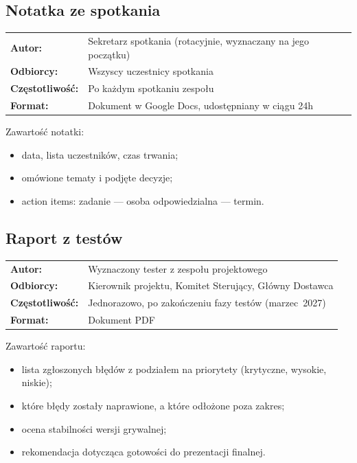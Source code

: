\documentclass[11pt,a4paper]{article}
\begin{document}
\subsection{Notatka ze spotkania}

\begin{tabular}{ll}
\textbf{Autor:}         & Sekretarz spotkania (rotacyjnie, wyznaczany na jego początku) \\
\textbf{Odbiorcy:}      & Wszyscy uczestnicy spotkania \\
\textbf{Częstotliwość:} & Po każdym spotkaniu zespołu \\
\textbf{Format:}        & Dokument w Google Docs, udostępniany w ciągu 24h \\
\end{tabular}

\vspace{0.5em}
Zawartość notatki:
\begin{itemize}[noitemsep]
    \item data, lista uczestników, czas trwania;
    \item omówione tematy i podjęte decyzje;
    \item action items: zadanie --- osoba odpowiedzialna --- termin.
\end{itemize}

\subsection{Raport z testów}

\begin{tabular}{ll}
\textbf{Autor:}         & Wyznaczony tester z zespołu projektowego \\
\textbf{Odbiorcy:}      & Kierownik projektu, Komitet Sterujący, Główny Dostawca \\
\textbf{Częstotliwość:} & Jednorazowo, po zakończeniu fazy testów (marzec~2027) \\
\textbf{Format:}        & Dokument PDF \\
\end{tabular}

\vspace{0.5em}
Zawartość raportu:
\begin{itemize}[noitemsep]
    \item lista zgłoszonych błędów z podziałem na priorytety (krytyczne, wysokie, niskie);
    \item które błędy zostały naprawione, a które odłożone poza zakres;
    \item ocena stabilności wersji grywalnej;
    \item rekomendacja dotycząca gotowości do prezentacji finalnej.
\end{itemize}
\end{document}
